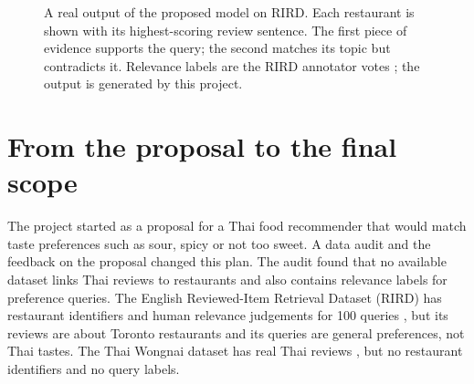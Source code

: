 \begin{figure}[H]
\centering
{}
\caption{A real output of the proposed model on RIRD. Each restaurant is shown with its
highest-scoring review sentence. The first piece of evidence supports the query; the second
matches its topic but contradicts it. Relevance labels are the RIRD annotator votes
\citep{rird2023}; the output is generated by this project.}
\label{fig:intro-example}
\end{figure}

\section{From the proposal to the final scope}
The project started as a proposal for a Thai food recommender that would match taste
preferences such as sour, spicy or not too sweet. A data audit and the feedback on the
proposal changed this plan. The audit found that no available dataset links Thai reviews to
restaurants and also contains relevance labels for preference queries. The English
Reviewed-Item Retrieval Dataset (RIRD) has restaurant identifiers and human relevance
judgements for 100 queries \citep{rird2023}, but its reviews are about Toronto restaurants and
its queries are general preferences, not Thai tastes. The Thai Wongnai dataset has real Thai
reviews \citep{wongnai2020}, but no restaurant identifiers and no query labels.

